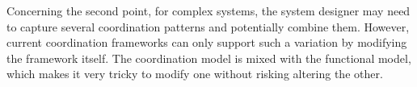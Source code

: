 Concerning the second point, for complex systems, the system designer may need to capture several coordination patterns and potentially combine them. However, current coordination frameworks can only support such a variation by modifying the framework itself. The coordination model is mixed with the functional model, which makes it very tricky to modify one without risking altering the other.







